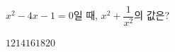 $x^2-4x-1=0$일 때, $x^2+\dfrac{1}{x^2}$의 값은?
\begin{choices32}{$12$}{$14$}{$16$}{$18$}{$20$}\end{choices32}
